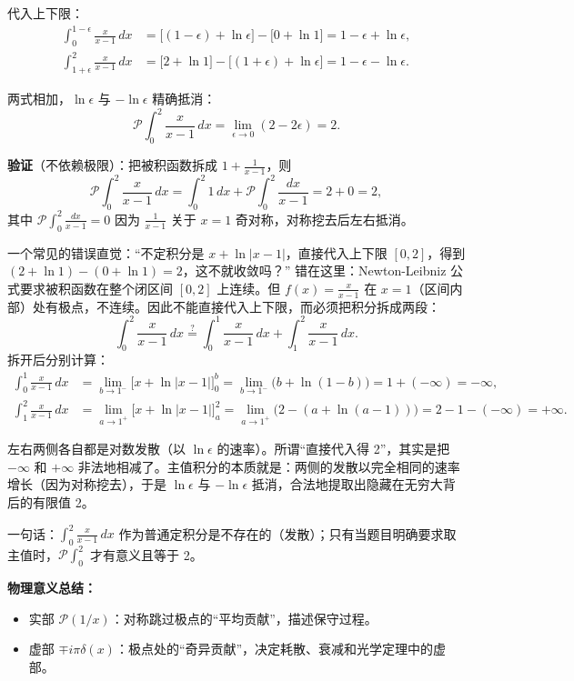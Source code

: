 \begin{derivationbox}
代入上下限：
\begin{align*}
\int_0^{1-\epsilon} \frac{x}{x-1}\, dx &= \bigl[(1-\epsilon) + \ln\epsilon\bigr] - \bigl[0 + \ln 1\bigr] = 1 - \epsilon + \ln\epsilon, \\
\int_{1+\epsilon}^2 \frac{x}{x-1}\, dx &= \bigl[2 + \ln 1\bigr] - \bigl[(1+\epsilon) + \ln\epsilon\bigr] = 1 - \epsilon - \ln\epsilon.
\end{align*}

两式相加，$\ln\epsilon$ 与 $-\ln\epsilon$ 精确抵消：
\[
\mathcal{P}\int_0^2 \frac{x}{x-1}\, dx = \lim_{\epsilon\to 0} (2 - 2\epsilon) = 2.
\]

\textbf{验证}（不依赖极限）：把被积函数拆成 $1 + \frac{1}{x-1}$，则
\[
\mathcal{P}\int_0^2 \frac{x}{x-1}\, dx = \int_0^2 1\, dx + \mathcal{P}\int_0^2 \frac{dx}{x-1} = 2 + 0 = 2,
\]
其中 $\mathcal{P}\int_0^2 \frac{dx}{x-1} = 0$ 因为 $\frac{1}{x-1}$ 关于 $x = 1$ 奇对称，对称挖去后左右抵消。

一个常见的错误直觉：``不定积分是 $x+\ln|x-1|$，直接代入上下限 $[0, 2]$，得到 $(2+\ln 1) - (0+\ln 1) = 2$，这不就收敛吗？'' 错在这里：Newton-Leibniz 公式要求被积函数在整个闭区间 $[0, 2]$ 上连续。但 $f(x) = \frac{x}{x-1}$ 在 $x = 1$（区间内部）处有极点，不连续。因此不能直接代入上下限，而必须把积分拆成两段：
\[
\int_0^2 \frac{x}{x-1}\, dx \stackrel{?}{=} \int_0^1 \frac{x}{x-1}\, dx + \int_1^2 \frac{x}{x-1}\, dx.
\]
拆开后分别计算：
\begin{align*}
\int_0^1 \frac{x}{x-1}\, dx &= \lim_{b\to 1^-} \bigl[x + \ln|x-1|\bigr]_0^b = \lim_{b\to 1^-} \bigl(b + \ln(1-b)\bigr) = 1 + (-\infty) = -\infty, \\
\int_1^2 \frac{x}{x-1}\, dx &= \lim_{a\to 1^+} \bigl[x + \ln|x-1|\bigr]_a^2 = \lim_{a\to 1^+} \bigl(2 - (a + \ln(a-1))\bigr) = 2 - 1 - (-\infty) = +\infty.
\end{align*}

左右两侧各自都是对数发散（以 $\ln\epsilon$ 的速率）。所谓``直接代入得 2''，其实是把 $-\infty$ 和 $+\infty$ 非法地相减了。主值积分的本质就是：两侧的发散以完全相同的速率增长（因为对称挖去），于是 $\ln\epsilon$ 与 $-\ln\epsilon$ 抵消，合法地提取出隐藏在无穷大背后的有限值 2。

一句话：$\displaystyle\int_0^2 \frac{x}{x-1}\, dx$ 作为普通定积分是不存在的（发散）；只有当题目明确要求取主值时，$\displaystyle\mathcal{P}\int_0^2$ 才有意义且等于 2。

\textbf{物理意义总结：}
\begin{itemize}
    \item 实部 $\mathcal{P}(1/x)$：对称跳过极点的``平均贡献''，描述保守过程。
    \item 虚部 $\mp i\pi\delta(x)$：极点处的``奇异贡献''，决定耗散、衰减和光学定理中的虚部。
\end{itemize}


\end{derivationbox}
